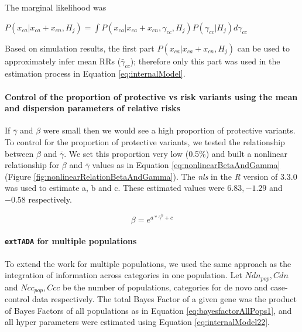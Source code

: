 \documentclass[]{article}
\begin{document}
The marginal likelihood was

$P(x_{ca}|x_{ca} + x_{cn}, H_j) = \int P(x_{ca}|x_{ca} + x_{cn}, \gamma_{cc}, H_j) P(\gamma_{cc} | H_j) d \gamma_{cc} $

Based on simulation results, the first part $P(x_{ca}|x_{ca} + x_{cn}, H_j)$ can be used to approximately infer mean RRs ($\bar{\gamma}_{cc}$); therefore only this part was used in the estimation process in Equation \ref{eq:internalModel}.





\paragraph{Control of the proportion of protective vs risk variants using the mean and
dispersion parameters of relative risks}

If $\bar{\gamma}$ and $\beta$ were small then we would see a high proportion of protective variants.
To control for the proportion of protective variants, we tested the
relationship between $\beta$ and $\bar{\gamma}$. We set this proportion very
low (0.5$\%$) and built a nonlinear relationship for $\beta$ and $\bar{\gamma}$
values as in Equation \ref{eq:nonlinearBetaAndGamma} (Figure
\ref{fig:nonlinearRelationBetaAndGamma}). The \textit{nls} in the
\textit{R} version of 3.3.0 \citep{rteam2016} was used to estimate
a, b and c. These estimated values were $6.83, -1.29$ and $
-0.58$ respectively.

\begin{equation}
\label{eq:nonlinearBetaAndGamma}
\beta = e^{a*\bar{\gamma}^b + c}
\end{equation}



\paragraph{\texttt{extTADA} for multiple populations}

To extend the work for multiple populations,
we used the same approach as the integration of information across categories in one
population. Let $Ndn_{pop}, Cdn$ and $Ncc_{pop}, Ccc$ be the
number of populations, categories for de novo and case-control data respectively. The total Bayes Factor of a given gene was the product of
Bayes Factors of all populations as in Equation
\ref{eq:bayesfactorAllPops1}, and all hyper parameters were estimated
using Equation \ref{eq:internalModel22}.
\end{document}
